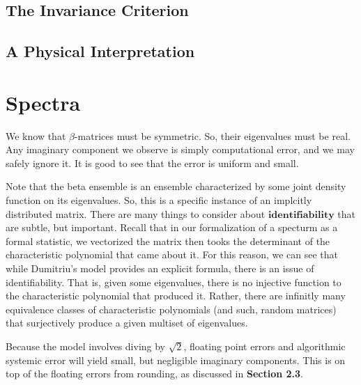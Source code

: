\ALGbeta


\subsection{The Invariance Criterion}


\subsection{A Physical Interpretation}




\newpage
\section{Spectra}

We know that $\beta$-matrices must be symmetric. So, their eigenvalues must be real. Any imaginary component we observe is simply computational error, and we may safely ignore it.
It is good to see that the error is uniform and small.

\begin{remark}
Note that the beta ensemble is an ensemble characterized by some joint density function on its eigenvalues. So, this is a specific instance of an implcitly distributed matrix.
There are many things to consider about $\textbf{identifiability}$ that are subtle, but important.
Recall that in our formalization of a specturm as a formal statistic, we vectorized the matrix then tooks the determinant of the characteristic polynomial that came about it.
For this reason, we can see that while Dumitriu's model provides an explicit formula, there is an issue of identifiability.
That is, given some eigenvalues, there is no injective function to the characteristic polynomial that produced it.
Rather, there are infinitly many equivalence classes of characteristic polynomials (and such, random matrices) that surjectively produce a given multiset of eigenvalues.
\end{remark}

\begin{remark}
Because the model involves diving by $\sqrt{2}$, floating point errors and algorithmic systemic error will yield small, but negligible imaginary components.
This is on top of the floating errors from rounding, as discussed in \textbf{Section 2.3}.
\end{remark}


